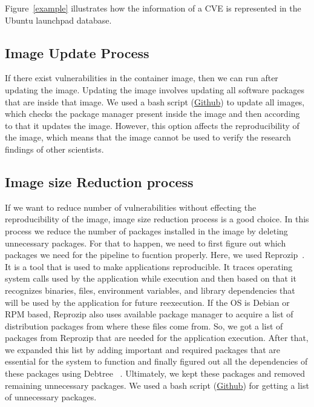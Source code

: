 \documentclass[a4paper,num-refs]{oup-contemporary}
\begin{document}
Figure~\ref{example} illustrates how the information of a CVE is represented
in the Ubuntu launchpad database.

\subsection{Image Update Process}

If there exist vulnerabilities in the container image, then we can
run after updating the
image. Updating the image involves updating all software packages that are
inside that image. We used a bash script (\href{https://github.com/kaurbhupinder/Vulnerability-Analysis}{Github}) 
to update all images, which checks the
package manager present inside the image and then according to that it
updates the image. However, this option affects the reproducibility
of the image, which means that the image cannot be used to verify the research
findings of other scientists.
\subsection{Image size Reduction process}
If we want to reduce number of vulnerabilities without effecting the reproducibility of the image,
image size reduction process is a good choice. In this process we reduce the number of packages
installed in the image by deleting unnecessary packages. For that to happen, we need to first figure
out which packages we need for the pipeline to fucntion properly. Here, we used 
Reprozip~\cite{rampin2016reprozip}. It is a tool that
is used to make applications reproducible. It traces operating system calls used by the
application while execution and then based on that it recognizes binaries, files, environment variables,
and library dependencies that will be used by the application for future reexecution. If the OS is
Debian or RPM based, Reprozip also
uses available package manager to acquire a list of distribution packages from where these files come from.
So, we got a list of packages from Reprozip that are needed for the application execution. 
After that, we expanded this list by adding important and required packages that are essential
for the system to function and finally figured out all the dependencies of these packages using Debtree
~\cite{debtree}.
Ultimately, we kept these packages and removed remaining unnecessary packages. We used a bash script
(\href{https://github.com/kaurbhupinder/Vulnerability-Analysis/blob/master/Scripts/script.sh}{Github}) for getting
a list of unnecessary packages. 
\end{document}
